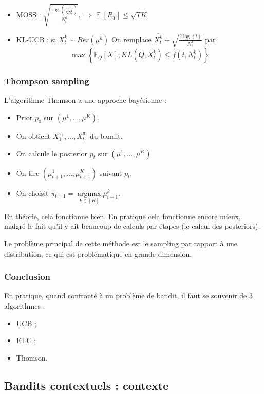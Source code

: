\documentclass{article}
\DeclareMathOperator*{\argmax}{argmax}
\DeclareMathOperator*{\E}{\mathbb{E}}
\theoremstyle{remark}
\theoremstyle{remark}
\begin{document}
\begin{itemize}
   \item MOSS : $\sqrt{\frac{\log(\frac{T}{K N_t^k})}{N_t^k}}$, $\Rightarrow \E[R_T] \leq \sqrt{TK}$
   \item KL-UCB : si $X_t^k \sim Ber(\mu^k)$
      On remplace $\overline{X_t^k} + \sqrt{\frac{2 \log(t)}{N_t^k}}$ par
      $$
      \max \left\{ \mathbb{E}_Q[X] ; KL\left(Q, \overline{X_t^k}\right) \leq f(t, N_t^k) \right\}
      $$
\end{itemize}

\subsubsection{Thompson sampling}

L'algorithme Thomson a une approche bayésienne :
\begin{itemize}
   \item Prior $p_0$ sur $(\mu^1, ..., \mu^K)$.
   \item On obtient $X_1^{\pi_1}, ..., X_t^{\pi_t}$ du bandit.
   \item On calcule le posterior $p_t$ sur $(\mu^1, ..., \mu^K)$
   \item On tire $(\mu_{t+1}^1, ..., \mu_{t+1}^K)$ suivant $p_t$.
   \item On choisit $\pi_{t+1} = \argmax\limits_{k \in [K]} \mu_{t+1}^k$.
\end{itemize}

En théorie, cela fonctionne bien. En pratique cela fonctionne encore mieux, malgré le fait qu'il y ait beaucoup de calculs par étapes (le calcul des posteriors).

Le problème principal de cette méthode est le sampling par rapport à une distribution, ce qui est problématique en grande dimension.

\subsubsection{Conclusion}

En pratique, quand confronté à un problème de bandit, il faut se souvenir de 3 algorithmes :
\begin{itemize}
   \item UCB ;
   \item ETC ;
   \item Thomson.
\end{itemize}

\subsection{Bandits contextuels : contexte}
\end{document}
